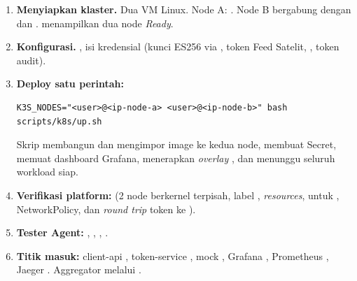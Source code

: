 \begin{enumerate}
\item \textbf{Menyiapkan klaster.} Dua VM Linux. Node A: . Node B bergabung dengan  dan .  menampilkan dua node \textit{Ready}.
\item \textbf{Konfigurasi.} , isi kredensial (kunci ES256 via , token Feed Satelit, , token audit).
\item \textbf{Deploy satu perintah:}
\begin{lstlisting}
K3S_NODES="<user>@<ip-node-a> <user>@<ip-node-b>" bash scripts/k8s/up.sh
\end{lstlisting}
Skrip membangun dan mengimpor image ke kedua node, membuat Secret, memuat dashboard Grafana, menerapkan \textit{overlay} , dan menunggu seluruh workload siap.
\item \textbf{Verifikasi platform:}  (2 node berkernel terpisah, label , \textit{resources},  untuk , NetworkPolicy, dan \textit{round trip} token ke ).
\item \textbf{Tester Agent:} , , , .
\item \textbf{Titik masuk:} client-api , token-service , mock , Grafana , Prometheus , Jaeger . Aggregator melalui .
\end{enumerate}
